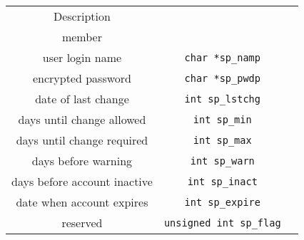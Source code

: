 \documentclass[10pt]{article}
\begin{document}
\begin{multicols}{2}
\begin{minipage}{1.5\columnwidth}
\begin{multicols*}{2}
\begin{minipage}{0.5\columnwidth}
\begin{tabular}{|c|c|c|}
                    \hline
                    Description                  & \makecell{\lstinline|struct spwd| \\member} \\
                    \hline \hline
                    user login name              & \lstinline|char *sp_namp|         \\
                    encrypted password           & \lstinline|char *sp_pwdp|         \\
                    date of last change          & \lstinline|int sp_lstchg|         \\
                    days until change allowed    & \lstinline|int sp_min|            \\
                    days until change required   & \lstinline|int sp_max|            \\
                    days before warning          & \lstinline|int sp_warn|           \\
                    days before account inactive & \lstinline|int sp_inact|          \\
                    date when account expires    & \lstinline|int sp_expire|         \\
                    reserved                     & \lstinline|unsigned int sp_flag|  \\
                    \hline
                \end{tabular}
            \end{minipage}
        \end{multicols*}
    \end{minipage}
    \begin{minipage}{\columnwidth}
        \begin{flushright}
            \vspace*{2em}

\end{flushright}
\end{minipage}
\end{multicols}
\end{document}
